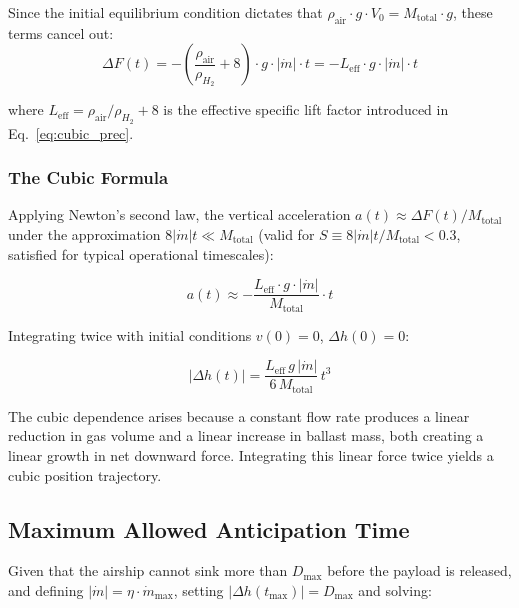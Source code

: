 Since the initial equilibrium condition dictates that $\rho_{\text{air}} \cdot g \cdot V_0 = M_{\text{total}} \cdot g$, these terms cancel out:
\begin{equation}
  \Delta F(t) = - \left( \frac{\rho_{\text{air}}}{\rho_{H_2}} + 8 \right) \cdot g \cdot |\dot{m}| \cdot t = -L_\text{eff} \cdot g \cdot |\dot{m}| \cdot t
\end{equation}

where $L_{\text{eff}} = \rho_{\text{air}}/\rho_{H_2} + 8$ is the effective specific lift factor introduced in Eq.~\eqref{eq:cubic_prec}.

\subsubsection{The Cubic Formula}

Applying Newton's second law, the vertical acceleration $a(t) \approx \Delta F(t)/M_{\text{total}}$ under the approximation $8|\dot{m}|t \ll M_{\text{total}}$ (valid for $S \equiv 8|\dot{m}|t/M_{\text{total}} < 0.3$, satisfied for typical operational timescales):

\begin{equation}
  a(t) \approx - \frac{L_{\text{eff}} \cdot g \cdot |\dot{m}|}{M_{\text{total}}} \cdot t
\end{equation}

Integrating twice with initial conditions $v(0)=0$, $\Delta h(0)=0$:

\begin{equation}
  \boxed{|\Delta h(t)| = \frac{L_\text{eff}\,g\,|\dot{m}|}{6\,M_\text{total}}\,t^3}
  \label{eq:cubic}
\end{equation}

The cubic dependence arises because a constant flow rate produces a linear reduction in gas volume and a linear increase in ballast mass, both creating a linear growth in net downward force. Integrating this linear force twice yields a cubic position trajectory.

\subsection{Maximum Allowed Anticipation Time}
\label{appx:tmax_derivation}

Given that the airship cannot sink more than $D_{\max}$ before the payload is released, and defining $|\dot{m}| = \eta \cdot \dot{m}_{\text{max}}$, setting $|\Delta h(t_{\max})| = D_{\max}$ and solving:

